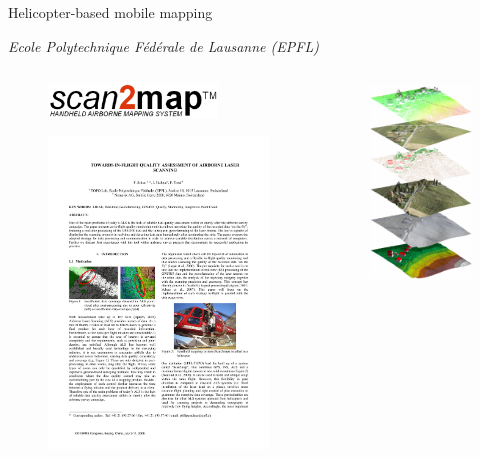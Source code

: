 \documentclass[envcountsect,usenames,dvipsnames]{beamer}
\theoremstyle{mystyle}
\begin{document}
\begin{frame}{Helicopter-based mobile mapping}

	\vspace{-0.35cm}

	\begin{center}
		\footnotesize{\textit{Ecole Polytechnique F\'{e}d\'{e}rale de Lausanne (EPFL)}}
	\end{center}

	\vspace{-0.6cm}

	  	\begin{columns}
		\begin{column}{0.65\textwidth}
			\vspace{0.1cm}
			\begin{figure}
			    \centering
			  \includegraphics[width = 4.5cm]{Images/scan2MapLogo}
			\end{figure}
			\vspace{-0.5cm}
			\begin{figure}
			    \centering
			  \includegraphics[width = 7cm]{Images/Scan2Map}
			\end{figure}
		\end{column}
		\begin{column}{0.35\textwidth}
			\begin{figure}
			    \centering
			  \includegraphics[width = 3.4cm]{Images/Scan2MapExample}

\end{figure}
\end{column}
\end{columns}
\end{frame}
\end{document}
